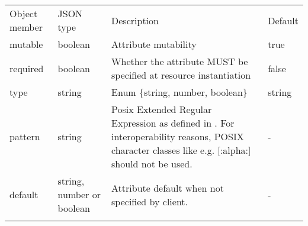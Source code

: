 \documentclass[10pt,a4paper]{article}
\begin{document}
 {
    \begin{tabular}{llll}
    \toprule
    Object member & JSON type & Description & Default \\
    \colrule
    mutable & boolean & Attribute mutability & true \\
    required & boolean & Whether the attribute MUST be specified at resource instantiation & false \\
    type & string & Enum \{string, number, boolean\}
    & string \\
    pattern & string & Posix Extended Regular Expression as defined in \cite{iso9945:2009}. For interoperability reasons, POSIX character classes like e.g. [:alpha:] should not be used. & - \\
    default & string, number or boolean & Attribute default when not specified by client. & - \\
    \botrule
    \end{tabular}
}
\end{document}
